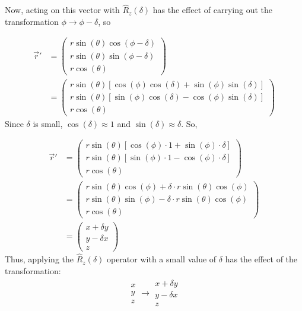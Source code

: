\documentclass{article}
\begin{document}
\begin{enumerate}[label=(\alph*)]
  Now, acting on this vector with $\hat{R}_z(\delta)$ has the effect of carrying out the transformation $\phi \rightarrow \phi - \delta$, so  

  \begin{align*}
    \vec{r}' &= 
    \begin{pmatrix}
      r \sin(\theta) \cos(\phi - \delta) \\
      r \sin(\theta) \sin(\phi - \delta) \\
      r \cos(\theta) 
    \end{pmatrix} \\
    &= \begin{pmatrix}
      r \sin(\theta) \left[ \cos(\phi)\cos(\delta) + \sin(\phi)\sin(\delta)  \right]\\
      r \sin(\theta) \left[\sin(\phi)\cos(\delta) - \cos(\phi)\sin(\delta) \right] \\
      r \cos(\theta) 
    \end{pmatrix}
  \end{align*}
  Since $\delta$ is small, $\cos(\delta) \approx 1$ and $\sin(\delta) \approx \delta$. So, 

  \begin{align*}
    \vec{r}' &= \begin{pmatrix}
      r \sin(\theta) [\cos(\phi) \cdot 1 + \sin(\phi) \cdot \delta] \\
      r \sin(\theta) \left[ \sin(\phi) \cdot 1 - \cos(\phi)\cdot \delta \right] \\
      r \cos(\theta) 
    \end{pmatrix} \\
    &= \begin{pmatrix}
      r\sin(\theta)\cos(\phi) + \delta \cdot r\sin(\theta)\cos(\phi) \\
      r\sin(\theta)\sin(\phi) - \delta \cdot r\sin(\theta)\cos(\phi) \\
      r\cos(\theta)
    \end{pmatrix} \\
    &= \begin{pmatrix}
      x + \delta y \\
      y - \delta x \\
      z
    \end{pmatrix}
  \end{align*} 
  Thus, applying the $\hat{R}_z(\delta)$ operator with a small value of $\delta$ has the effect of the transformation:
  \begin{align*}
    \begin{array}{cc}
      x \\ y \\ z
    \end{array} \rightarrow \begin{array}{cc}
      x + \delta y \\ y - \delta x \\ z
    \end{array}
  \end{align*}
  

\end{enumerate}
\end{document}
